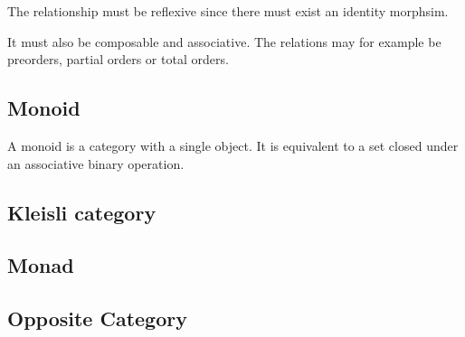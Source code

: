 \documentclass[preview]{standalone}
\begin{document}
The relationship must be reflexive since there must exist an identity morphsim.

\begin{center}
\end{center}

It must also be composable and associative.
The relations may for example be preorders, partial orders
or total orders.


\subsection{Monoid}

A monoid is a category with a single object.
It is equivalent to a set closed under an associative binary operation. 

\subsection{Kleisli category}


\subsection{Monad}


\subsection{Opposite Category}
\end{document}
